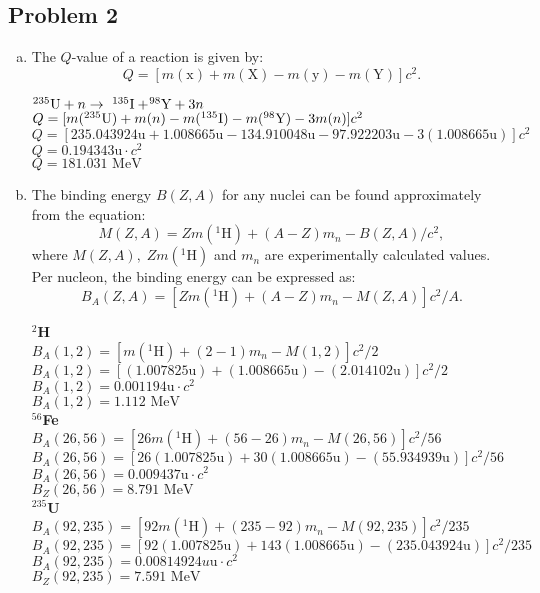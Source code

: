 \documentclass{report}
\newcommand{\tab}{\-\hspace{1.5cm}}
\begin{document}
\subsection*{Problem 2}
\begin{enumerate}[a)]
\item The $Q$-value of a reaction is given by:$$Q=[m(\text{x})+m(\text{X})-m(\text{y})-m(\text{Y})]c^{2}.$$

\begin{spacing}{1.75}	
$^{235}\text{\normalfont{U}}+n \rightarrow  \-\ ^{135}\text{\normalfont{I}}+ \! ^{98}\text{\normalfont{Y}}+3n$\\
	\tab $Q = [m(^{235}\text{\normalfont{U}})+m(n)-m(^{135}\text{\normalfont{I}})-m(^{98}\text{\normalfont{Y}})-3m(n)]c^{2}$\\
	\tab $Q = [235.043924\text{u}+1.008665\text{u}-134.910048\text{u}-97.922203\text{u}-3(1.008665\text{u})]c^{2}$\\
	\tab $Q = 0.194343\text{u} \cdot c^{2}$\\
	\tab $\boxed{Q = 181.031 \text{ MeV}}$ 
\end{spacing}


\item The binding energy $B(Z,A)$ for any nuclei can be found approximately from the equation:$$M(Z,A) = Zm(^{1}\text{H})+(A-Z)m_{n}-B(Z,A)/c^{2},$$ where $M(Z,A),\; Zm(^{1}\text{H})$ and $m_{n}$ are experimentally calculated values. Per nucleon, the binding energy can be expressed as: $$B_{A}(Z,A) = [Zm(^{1}\text{H})+(A-Z)m_{n}-M(Z,A)]c^{2}/A.$$

\begin{spacing}{1.75}

\textbf{$^{2}$H}\\
$B_{A}(1,2) = [m(^{1}\text{H})+(2-1)m_{n}-M(1,2)]c^{2}/2$\\
$B_{A}(1,2) = [(1.007825\text{u})+(1.008665\text{u})-(2.014102\text{u})]c^{2}/2$\\
$B_{A}(1,2) = 0.001194\text{u} \cdot c^{2}$\\
$\boxed{B_{A}(1,2) = 1.112\text{ MeV}}$\\
\textbf{$^{56}$Fe}\\
$B_{A}(26,56) = [26m(^{1}\text{H})+(56-26)m_{n}-M(26,56)]c^{2}/56$\\
$B_{A}(26,56) = [26(1.007825\text{u})+30(1.008665\text{u})-(55.934939\text{u})]c^{2}/56$\\
$B_{A}(26,56) = 0.009437\text{u} \cdot c^{2}$\\
$\boxed{B_{Z}(26,56) = 8.791\text{ MeV}}$\\
\textbf{$^{235}$U}\\
$B_{A}(92,235) = [92m(^{1}\text{H})+(235-92)m_{n}-M(92,235)]c^{2}/235$\\
$B_{A}(92,235) = [92(1.007825\text{u})+143(1.008665\text{u})-(235.043924\text{u})]c^{2}/235$\\
$B_{A}(92,235) = 0.00814924 u\text{u} \cdot c^{2}$\\
$\boxed{B_{Z}(92,235) = 7.591\text{ MeV}}$
\end{spacing}
\end{enumerate}
\end{document}
